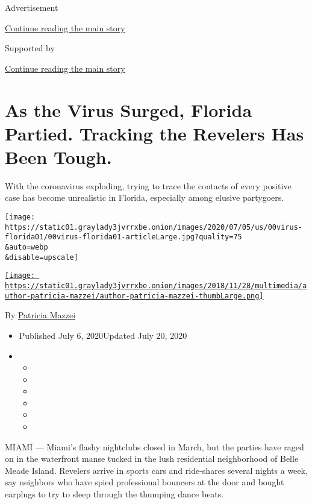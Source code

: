 Advertisement

\protect\hyperlink{after-top}{Continue reading the main story}

Supported by

\protect\hyperlink{after-sponsor}{Continue reading the main story}

\hypertarget{as-the-virus-surged-florida-partied-tracking-the-revelers-has-been-tough}{%
\section{As the Virus Surged, Florida Partied. Tracking the Revelers Has
Been
Tough.}\label{as-the-virus-surged-florida-partied-tracking-the-revelers-has-been-tough}}

With the coronavirus exploding, trying to trace the contacts of every
positive case has become unrealistic in Florida, especially among
elusive partygoers.

\texttt{[image: https://static01.graylady3jvrrxbe.onion/images/2020/07/05/us/00virus-florida01/00virus-florida01-articleLarge.jpg?quality=75\\\&auto=webp\\\&disable=upscale]}

\href{https://www.nytimes3xbfgragh.onion/by/patricia-mazzei}{\texttt{[image: https://static01.graylady3jvrrxbe.onion/images/2018/11/28/multimedia/author-patricia-mazzei/author-patricia-mazzei-thumbLarge.png]}}

By \href{https://www.nytimes3xbfgragh.onion/by/patricia-mazzei}{Patricia
Mazzei}

\begin{itemize}
\item
  Published July 6, 2020Updated July 20, 2020
\item
  \begin{itemize}
  \item
  \item
  \item
  \item
  \item
  \item
  \end{itemize}
\end{itemize}

MIAMI --- Miami's flashy nightclubs closed in March, but the parties
have raged on in the waterfront manse tucked in the lush residential
neighborhood of Belle Meade Island. Revelers arrive in sports cars and
ride-shares several nights a week, say neighbors who have spied
professional bouncers at the door and bought earplugs to try to sleep
through the thumping dance beats.

